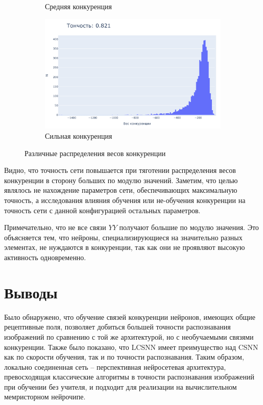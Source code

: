 \documentclass[a4paper]{article}
\begin{document}
\begin{figure}
\begin{subfigure}{0.2\textwidth}
    \caption{Средняя конкуренция} 
\end{subfigure}
\begin{subfigure}{0.2\textwidth}
    \includegraphics[width=\textwidth,keepaspectratio=true]{competition_distribution_best_ru.pdf}
    \caption{Сильная конкуренция}
\end{subfigure}
\caption{Различные распределения весов конкуренции}
\end{figure}

Видно, что точность сети повышается при тяготении распределения весов конкуренции в сторону больших по модулю значений. Заметим, что целью являлось не нахождение параметров сети, обеспечивающих максимальную точность, а исследования влияния обучения или не-обучения конкуренции на точность сети с данной конфигурацией остальных параметров.

Примечательно, что не все связи $YY$ получают большие по модулю значения. Это объясняется тем, что нейроны, специализирующиеся на значительно разных элементах, не нуждаются в конкуренции, так как они не проявляют высокую активность одновременно.

\section{Выводы}
Было обнаружено, что обучение связей конкуренции нейронов, имеющих общие рецептивные поля, позволяет добиться большей точности распознавания изображений по сравнению с той же архитектурой, но с необучаемыми связями конкуренции. Также было показано, что LCSNN имеет преимущество над CSNN как по скорости обучения, так и по точности распознавания. Таким образом, локально соединенная сеть – перспективная нейросетевая архитектура, превосходящая классические алгоритмы в точности распознавания изображений при обучении без учителя, и подходит для реализации на вычислительном мемристорном нейрочипе.

\printbibliography
\end{document}
